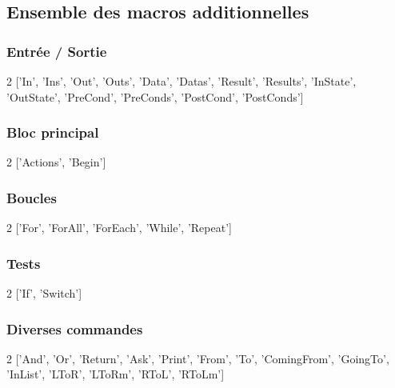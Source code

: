 \documentclass[12pt,a4paper]{article}
\begin{document}

\subsection{Ensemble des macros additionnelles}

\subsubsection{Entrée / Sortie}

\begin{multicols}{2}
['In', 'Ins', 'Out', 'Outs', 'Data', 'Datas', 'Result', 'Results', 'InState', 'OutState', 'PreCond', 'PreConds', 'PostCond', 'PostConds']
\vfill\null
\end{multicols}

\subsubsection{Bloc principal}

\begin{multicols}{2}
['Actions', 'Begin']
\vfill\null
\end{multicols}

\subsubsection{Boucles}

\begin{multicols}{2}
['For', 'ForAll', 'ForEach', 'While', 'Repeat']
\vfill\null
\end{multicols}

\subsubsection{Tests}

\begin{multicols}{2}
['If', 'Switch']
\vfill\null
\end{multicols}

\subsubsection{Diverses commandes}

\begin{multicols}{2}
['And', 'Or', 'Return', 'Ask', 'Print', 'From', 'To', 'ComingFrom', 'GoingTo', 'InList', 'LToR', 'LToRm', 'RToL', 'RToLm']
\vfill\null
\end{multicols}

\end{document}
